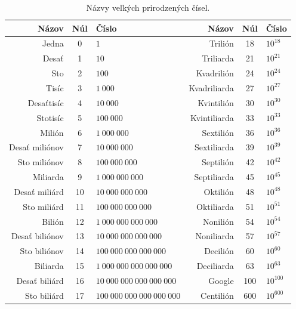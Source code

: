 \documentclass{article}
\begin{document}
\begin{table}[H]
  \centering
  \renewcommand{\arraystretch}{1.2}
  \begin{tabular}{|r|c|l|r|c|l|}
    \hline
    \textbf{Názov} & \textbf{Núl} & \textbf{Číslo} &
    \textbf{Názov} & \textbf{Núl} & \textbf{Číslo} \\
    \hline
    Jedna & 0 & \(1\) &
    Trilión & 18 & \(10^{18}\) \\
    \hline
    Desať & 1 & \(10\) &
    Triliarda & 21 & \(10^{21}\) \\
    \hline
    Sto & 2 & \(100\) &
    Kvadrilión & 24 & \(10^{24}\) \\
    \hline
    Tisíc & 3 & \(1\ 000\) &
    Kvadriliarda & 27 & \(10^{27}\) \\
    \hline
    Desaťtisíc & 4 & \(10\ 000\) &
    Kvintilión & 30 & \(10^{30}\) \\
    \hline
    Stotisíc & 5 & \(100\ 000\) &
    Kvintiliarda & 33 & \(10^{33}\) \\
    \hline
    Milión & 6 & \(1\ 000\ 000\) &
    Sextilión & 36 & \(10^{36}\) \\
    \hline
    Desať miliónov & 7 & \(10\ 000\ 000\) &
    Sextiliarda & 39 & \(10^{39}\) \\
    \hline
    Sto miliónov & 8 & \(100\ 000\ 000\) &
    Septilión & 42 & \(10^{42}\) \\
    \hline
    Miliarda & 9 & \(1\ 000\ 000\ 000\) &
    Septiliarda & 45 & \(10^{45}\) \\
    \hline
    Desať miliárd & 10 & \(10\ 000\ 000\ 000\) &
    Oktilión & 48 & \(10^{48}\) \\
    \hline
    Sto miliárd & 11 & \(100\ 000\ 000\ 000\) &
    Oktiliarda & 51 & \(10^{51}\) \\
    \hline
    Bilión & 12 & \(1\ 000\ 000\ 000\ 000\) &
    Nonilión & 54 & \(10^{54}\) \\
    \hline
    Desať biliónov & 13 & \(10\ 000\ 000\ 000\ 000\) &
    Noniliarda & 57 & \(10^{57}\) \\
    \hline
    Sto biliónov & 14 & \(100\ 000\ 000\ 000\ 000\) &
    Decilión & 60 & \(10^{60}\) \\
    \hline
    Biliarda & 15 & \(1\ 000\ 000\ 000\ 000\ 000\) &
    Deciliarda & 63 & \(10^{63}\) \\
    \hline
    Desať biliárd & 16 & \(10\ 000\ 000\ 000\ 000\ 000\) &
    Google & 100 & \(10^{100}\) \\
    \hline
    Sto biliárd & 17 & \(100\ 000\ 000\ 000\ 000\ 000\) &
    Centilión & 600 & \(10^{600}\) \\
    \hline
  \end{tabular}
  \caption{Názvy veľkých prirodzených čísel.}
\end{table}
\end{document}
